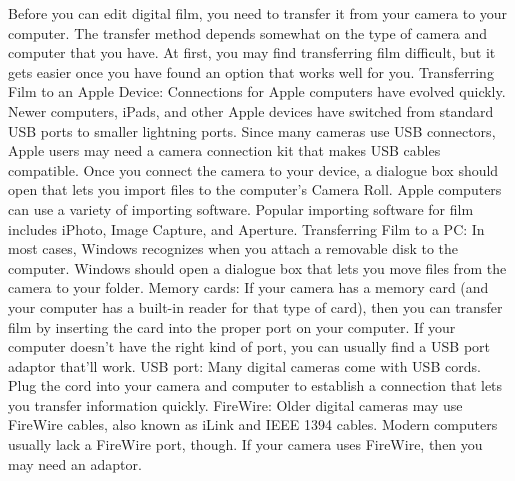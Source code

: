 Before you can edit digital film, you need to transfer it from your camera to your computer. The transfer method depends somewhat on the type of camera and computer that you have. At first, you may find transferring film difficult, but it gets easier once you have found an option that works well for you.
Transferring Film to an Apple Device:
Connections for Apple computers have evolved quickly. Newer computers, iPads, and other Apple devices have switched from standard USB ports to smaller lightning ports. Since many cameras use USB connectors, Apple users may need a camera connection kit that makes USB cables compatible.
Once you connect the camera to your device, a dialogue box should open that lets you import files to the computer's Camera Roll. Apple computers can use a variety of importing software. Popular importing software for film includes iPhoto, Image Capture, and Aperture.
Transferring Film to a PC:
In most cases, Windows recognizes when you attach a removable disk to the computer. Windows should open a dialogue box that lets you move files from the camera to your folder.
Memory cards: If your camera has a memory card (and your computer has a built-in reader for that type of card), then you can transfer film by inserting the card into the proper port on your computer. If your computer doesn't have the right kind of port, you can usually find a USB port adaptor that'll work.
USB port: Many digital cameras come with USB cords. Plug the cord into your camera and computer to establish a connection that lets you transfer information quickly.
FireWire: Older digital cameras may use FireWire cables, also known as iLink and IEEE 1394 cables. Modern computers usually lack a FireWire port, though. If your camera uses FireWire, then you may need an adaptor.

